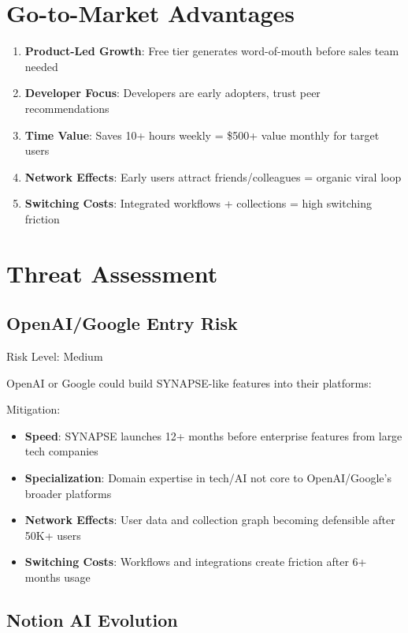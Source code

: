 \documentclass{report}
\begin{document}
\section{Go-to-Market Advantages}

\begin{enumerate}
    \item \textbf{Product-Led Growth}: Free tier generates word-of-mouth before sales team needed
    \item \textbf{Developer Focus}: Developers are early adopters, trust peer recommendations
    \item \textbf{Time Value}: Saves 10+ hours weekly = \$500+ value monthly for target users
    \item \textbf{Network Effects}: Early users attract friends/colleagues = organic viral loop
    \item \textbf{Switching Costs}: Integrated workflows + collections = high switching friction
\end{enumerate}

\section{Threat Assessment}

\subsection{OpenAI/Google Entry Risk}

Risk Level: Medium

OpenAI or Google could build SYNAPSE-like features into their platforms:

Mitigation:
\begin{itemize}
    \item \textbf{Speed}: SYNAPSE launches 12+ months before enterprise features from large tech companies
    \item \textbf{Specialization}: Domain expertise in tech/AI not core to OpenAI/Google's broader platforms
    \item \textbf{Network Effects}: User data and collection graph becoming defensible after 50K+ users
    \item \textbf{Switching Costs}: Workflows and integrations create friction after 6+ months usage
\end{itemize}

\subsection{Notion AI Evolution}
\end{document}
